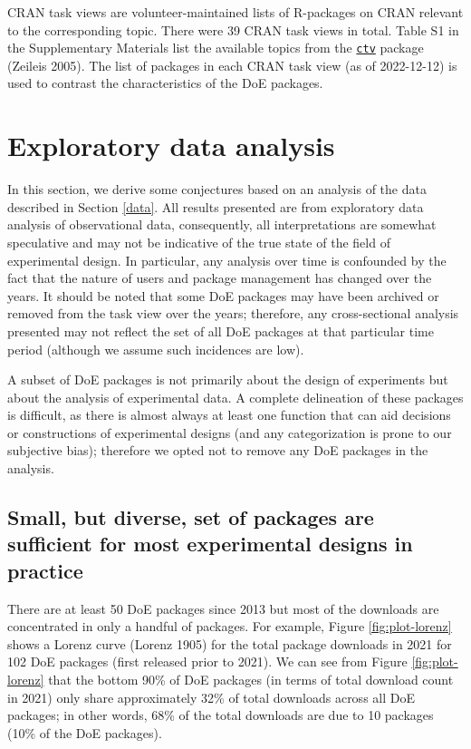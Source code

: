 \documentclass{article}
\begin{document}
CRAN task views are volunteer-maintained lists of R-packages on CRAN
relevant to the corresponding topic. There were 39 CRAN task views in
total. Table S1 in the Supplementary Materials list the available topics
from the
\href{https://cran.r-project.org/web/packages/ctv/index.html}{\texttt{ctv}}
package (Zeileis 2005). The list of packages in each CRAN task view (as
of 2022-12-12) is used to contrast the characteristics of the DoE
packages.

\hypertarget{eda}{%
\section{Exploratory data analysis}\label{eda}}

In this section, we derive some conjectures based on an analysis of the
data described in Section \ref{data}. All results presented are from
exploratory data analysis of observational data, consequently, all
interpretations are somewhat speculative and may not be indicative of
the true state of the field of experimental design. In particular, any
analysis over time is confounded by the fact that the nature of users
and package management has changed over the years. It should be noted
that some DoE packages may have been archived or removed from the task
view over the years; therefore, any cross-sectional analysis presented
may not reflect the set of all DoE packages at that particular time
period (although we assume such incidences are low).

A subset of DoE packages is not primarily about the design of
experiments but about the analysis of experimental data. A complete
delineation of these packages is difficult, as there is almost always at
least one function that can aid decisions or constructions of
experimental designs (and any categorization is prone to our subjective
bias); therefore we opted not to remove any DoE packages in the
analysis.

\hypertarget{small-but-diverse-set-of-packages-are-sufficient-for-most-experimental-designs-in-practice}{%
\subsection{Small, but diverse, set of packages are sufficient for most
experimental designs in
practice}\label{small-but-diverse-set-of-packages-are-sufficient-for-most-experimental-designs-in-practice}}

There are at least 50 DoE packages since 2013 but most of the downloads
are concentrated in only a handful of packages. For example, Figure
\ref{fig:plot-lorenz} shows a Lorenz curve (Lorenz 1905) for the total
package downloads in 2021 for 102 DoE packages (first released prior to
2021). We can see from Figure \ref{fig:plot-lorenz} that the bottom 90\%
of DoE packages (in terms of total download count in 2021) only share
approximately 32\% of total downloads across all DoE packages; in other
words, 68\% of the total downloads are due to 10 packages (10\% of the
DoE packages).
\end{document}
